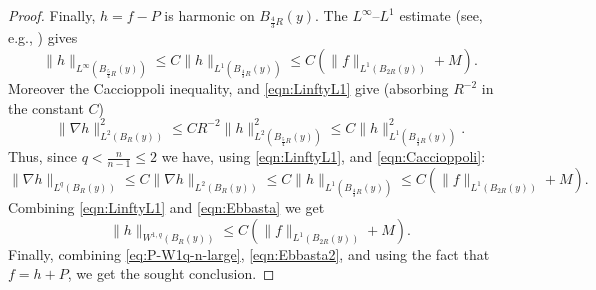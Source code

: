 \documentclass[12pt,a4paper,reqno]{amsart}
\renewcommand{\leq}{\leqslant}
\begin{document}
\begin{proof}
Finally, $h=f-P$ is harmonic on $B_{\frac{4}{3}R}(y)$.  The $L^\infty$--$L^1$ estimate (see, e.g., \cite[Theorem A.4]{BenattiViolo}) gives
\begin{equation}\label{eqn:LinftyL1}
\|h\|_{L^\infty(B_{\frac{5}{4}R}(y))}\leq C\|h\|_{L^1(B_{\frac{4}{3}R}(y))}\leq C(\|f\|_{L^1(B_{2R}(y))}+M).
\end{equation}
Moreover the Caccioppoli inequality, and \eqref{eqn:LinftyL1} give (absorbing $R^{-2}$ in the constant $C$)
\begin{equation}\label{eqn:Caccioppoli}
\|\nabla h\|_{L^2(B_{R}(y))}^2\leq CR^{-2}\|h\|_{L^2(B_{\frac{5}{4}R}(y))}^2\leq C\|h\|_{L^1(B_{\frac{4}{3}R}(y))}^2.
\end{equation}
Thus, since $q<\frac{n}{n-1}\leq 2$ we have, using \eqref{eqn:LinftyL1}, and \eqref{eqn:Caccioppoli}:
\begin{equation}\label{eqn:Ebbasta}
\|\nabla h\|_{L^q(B_{R}(y))}\leq C\|\nabla h\|_{L^2(B_{R}(y))}\leq C\|h\|_{L^1(B_{\frac{4}{3}R}(y))}\leq   C(\|f\|_{L^1(B_{2R}(y))}+M).
\end{equation}
Combining \eqref{eqn:LinftyL1} and \eqref{eqn:Ebbasta} we get
\begin{equation}\label{eqn:Ebbasta2}
    \|h\|_{W^{1,q}(B_R(y))}\leq C(\|f\|_{L^1(B_{2R}(y))}+M).
\end{equation}
Finally, combining \eqref{eq:P-W1q-n-large}, \eqref{eqn:Ebbasta2}, and using the fact that $f=h+P$, we get the sought conclusion.
\end{proof}



\printbibliography
\end{document}
